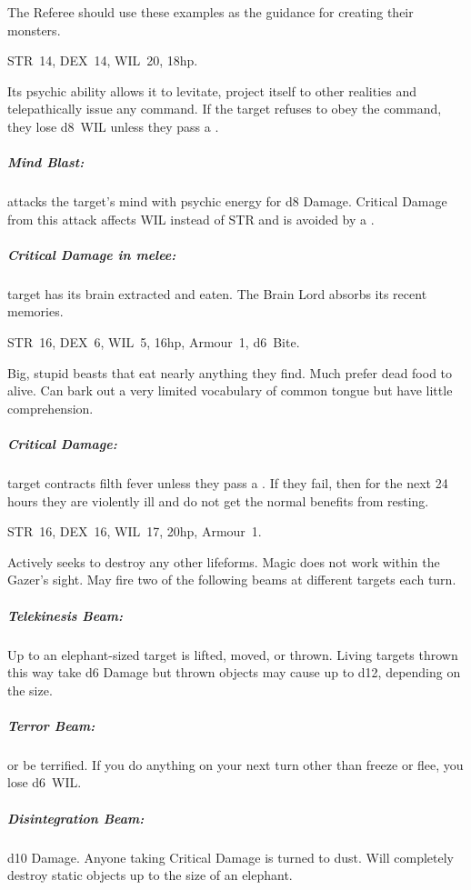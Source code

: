 \documentclass[itdr]{subfiles}
\begin{document}

The Referee should use these examples as the guidance for creating their monsters.

STR~14, DEX~14, WIL~20, 18hp.

Its psychic ability allows it to levitate, project itself to other realities and telepathically issue any command. If the target refuses to obey the command, they lose d8~WIL unless they pass a .

\subparagraph{Mind Blast:} attacks the target's mind with psychic energy for d8 Damage. Critical Damage from this attack affects WIL instead of STR and is avoided by a .

\subparagraph{Critical Damage in melee:} target has its brain extracted and eaten. The Brain Lord absorbs its recent memories.



STR~16, DEX~6, WIL~5, 16hp, Armour~1, d6~Bite.

Big, stupid beasts that eat nearly anything they find. Much prefer dead food to alive. Can bark out a very limited vocabulary of common tongue but have little comprehension.

\subparagraph{Critical Damage:} target contracts filth fever unless they pass a . If they fail, then for the next 24 hours they are violently ill and do not get the normal benefits from resting.

\vspace{-1em}

\vfill
\break

STR~16, DEX~16, WIL~17, 20hp, Armour~1.

Actively seeks to destroy any other lifeforms. Magic does not work within the Gazer's sight. May fire two of the following beams at different targets
each turn.

\subparagraph{Telekinesis Beam:} Up to an elephant-sized target is lifted, moved, or thrown. Living targets thrown this way take d6 Damage but thrown objects may cause up to d12, depending on the size.

\subparagraph{Terror Beam:}  or be terrified. If you do anything on your next turn other than freeze or flee, you lose d6~WIL.

\subparagraph{Disintegration Beam:} d10 Damage. Anyone taking Critical Damage is turned to dust. Will completely destroy static objects up to the size of an elephant.
\end{document}
